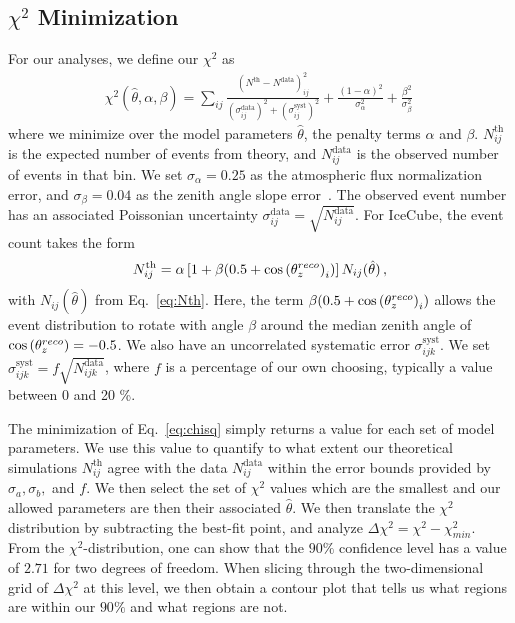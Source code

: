 \subsection{\texorpdfstring{$\chi^2$}{Chi-squared} Minimization}
For our analyses, we define our $\chi^2$ as
\begin{align} \label{eq:chisq}
    \chi^{2}(\hat{\theta},\alpha,\beta)=\sum_{ij} \frac{\left(N^\text{th}-N^\text{data}\right)_{ij}^{2}}
    {\left(\sigma^\text{data}_{ij}\right)^{2} + \left(\sigma^\text{syst}_{ij}\right)^{2}}+ 
    \frac{(1-\alpha)^2}{\sigma_\alpha^2} + \frac{\beta^2}{\sigma_\beta^2}\,
\end{align}
where we minimize over the model parameters $\hat{\theta}$, the penalty terms $\alpha$ and $\beta$.
$N_{ij}^\text{th}$ is the expected number of events from theory, and $N_{ij}^\text{data}$ is the observed number of events in that bin. 
We set $\sigma_\alpha = 0.25$ as the atmospheric flux normalization error, and $\sigma_\beta = 0.04$ as the zenith angle slope error~\cite{hondapaper}. 
The observed event number has an associated Poissonian uncertainty $\sigma_{ij}^\text{data} = \sqrt{N_{ij}^\text{data}}$.
For IceCube, the event count takes the form
\begin{align}
    N^\text{th}_{ij} = \alpha\left[1+\beta (0.5 + \cos{(\theta_z^{reco})}_i )\right] N_{ij}(\hat{\theta})\,,
\end{align}
with $N_{ij}(\hat{\theta})$ from Eq.~\ref{eq:Nth}. Here, the term $ \beta (0.5 + \cos{(\theta_z^{reco})}_i )$ allows the event distribution to rotate with angle $\beta$ around the median zenith angle of $\cos{(\theta_z^{reco})} = -0.5$.
We also have an uncorrelated systematic error $\sigma_{ijk}^\text{syst}$. We set $\sigma_{ijk}^\text{syst} = f\sqrt{N_{ijk}^\text{data}}$, where $f$ is a percentage of our own choosing,
typically a value between 0 and 20 \%.

The minimization of Eq.~\ref{eq:chisq} simply returns a value for each set of model parameters. We use this value to quantify to what extent
our theoretical simulations $N^\text{th}_{ij}$ agree with the data $N^\text{data}_{ij}$ within the error bounds provided by $\sigma_a,\sigma_b,$ and $f$.
We then select the set of $\chi^2$ values which are the smallest and our allowed parameters are then their associated $\hat{\theta}$.
We then translate the $\chi^2$ distribution by subtracting the best-fit point, and analyze $\Delta \chi^2 = \chi^2 - \chi^2_{min}$.
From the $\chi^2$-distribution, one can show that the $90\%$ confidence level has a value of $2.71$ for two degrees of freedom. When slicing through the 
two-dimensional grid of $\Delta \chi^2$ at this level, we then obtain a contour plot that tells us what regions are within our $90 \%$ and what regions are not.

